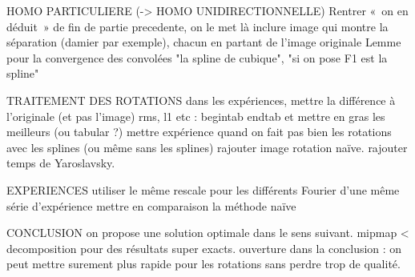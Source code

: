 HOMO PARTICULIERE (-> HOMO UNIDIRECTIONNELLE)
	Rentrer « on en déduit » de fin de partie precedente, on le met là
	inclure image qui montre la séparation (damier par exemple), chacun en partant de l'image originale
	Lemme pour la convergence des convolées
	"la spline de cubique", "si on pose F1 est la spline"

TRAITEMENT DES ROTATIONS
	dans les expériences, mettre la différence à l'originale (et pas l'image)
	rms, l1 etc : begin{tab} end{tab} et mettre en gras les meilleurs (ou tabular ?)
	mettre expérience quand on fait pas bien les rotations avec les splines (ou même sans les splines)
	rajouter image rotation naïve.
	rajouter temps de Yaroslavsky.
	

EXPERIENCES
	utiliser le même rescale pour les différents Fourier d'une même série d'expérience
	mettre en comparaison la méthode naïve

CONCLUSION
	on propose une solution optimale dans le sens suivant. mipmap < decomposition pour des résultats super exacts.
	ouverture dans la conclusion : on peut mettre surement plus rapide pour les rotations sans perdre trop de qualité.
